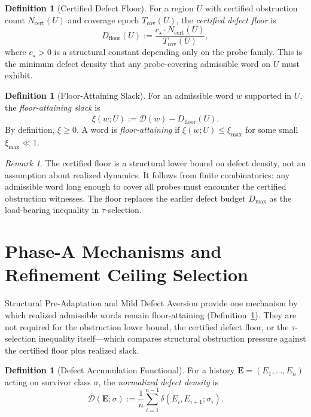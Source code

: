 \documentclass[11pt,a4paper]{article}
\theoremstyle{definition}
\newtheorem{definition}[theorem]{Definition}
\theoremstyle{remark}
\newtheorem{remark}[theorem]{Remark}
\begin{document}
\begin{definition}[Certified Defect Floor]\label{def:floor}
For a region $U$ with certified obstruction count $N_{\mathrm{cert}}(U)$ and coverage epoch $T_{\mathrm{cov}}(U)$, the \emph{certified defect floor} is
\[
  D_{\mathrm{floor}}(U) := \frac{c_\star \cdot N_{\mathrm{cert}}(U)}{T_{\mathrm{cov}}(U)},
\]
where $c_\star > 0$ is a structural constant depending only on the probe family. This is the minimum defect density that any probe-covering admissible word on $U$ must exhibit.
\end{definition}

\begin{definition}[Floor-Attaining Slack]\label{def:slack}
For an admissible word $w$ supported in $U$, the \emph{floor-attaining slack} is
\[
  \xi(w; U) := \overline{\mathcal{D}}(w) - D_{\mathrm{floor}}(U).
\]
By definition, $\xi \geq 0$. A word is \emph{floor-attaining} if $\xi(w; U) \leq \xi_{\max}$ for some small $\xi_{\max} \ll 1$.
\end{definition}

\begin{remark}
The certified floor is a structural lower bound on defect density, not an assumption about realized dynamics. It follows from finite combinatorics: any admissible word long enough to cover all probes must encounter the certified obstruction witnesses. The floor replaces the earlier defect budget $D_{\max}$ as the load-bearing inequality in $\tau$-selection.
\end{remark}


\section{Phase-A Mechanisms and Refinement Ceiling Selection}

Structural Pre-Adaptation and Mild Defect Aversion provide one mechanism by which realized admissible words remain floor-attaining (Definition~\ref{def:slack}). They are not required for the obstruction lower bound, the certified defect floor, or the $\tau$-selection inequality itself---which compares structural obstruction pressure against the certified floor plus realized slack.

\begin{definition}[Defect Accumulation Functional]\label{def:defectfunc}
For a history $\mathbf{E} = (E_1, \dots, E_n)$ acting on survivor class $\sigma$, the \emph{normalized defect density} is
\[
  \overline{\mathcal{D}}(\mathbf{E}; \sigma) := \frac{1}{n} \sum_{i=1}^{n-1} \delta(E_i, E_{i+1}; \sigma_i).
\]
\end{definition}
\end{document}
